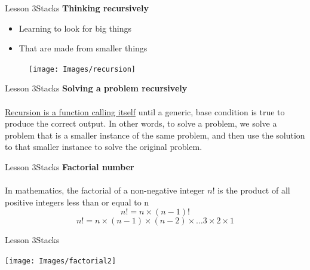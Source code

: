 \documentclass[aspectratio=1610]{beamer}
\begin{document}
\begin{frame}{Lesson 3}{Stacks}
{\LARGE\textbf{{Thinking recursively}}}
\Large
\begin{minipage}{0.60\textwidth}
    \begin{itemize}
      \item Learning to look for big things 
      \item That are made from smaller things
    \end{itemize}
  \end{minipage}
\begin{minipage}{.0\textwidth}
      \begin{figure}
        \texttt{[image: Images/recursion]}
      \end{figure}
  \end{minipage}  
\end{frame}



\begin{frame}{Lesson 3}{Stacks}
\LARGE
\textbf{Solving a problem recursively}\\~\\
\underline{Recursion is a function calling itself} until a generic,
base condition is true to produce the correct output. In other words,
to solve a problem, we solve a problem that is a smaller instance of
the same problem, and then use the solution to that smaller instance
to solve the original problem.
\end{frame}



\begin{frame}{Lesson 3}{Stacks}
\LARGE
\textbf{Factorial number}\\~\\
In mathematics, the factorial of a non-negative integer 
$n!$ is the product of all positive integers less than or equal to n
\begin{equation}
n!=n \times (n-1)!
\end{equation}
\begin{equation}
n! = n \times (n-1) \times (n-2) \times \dots 3 \times 2 \times 1
\end{equation}
\end{frame}


\begin{frame}{Lesson 3}{Stacks}
\begin{center}
\texttt{[image: Images/factorial2]}
\end{center}
\end{frame}
\end{document}
